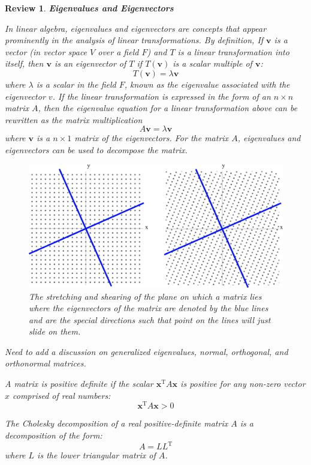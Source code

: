 \documentclass[12pt,letter]{article}
\numberwithin{ex}{section} %
\newtheorem{re}{Review}
\numberwithin{re}{section} %
\newenvironment{review}{\begin{mdframed}[middlelinewidth=2mm,roundcorner=20pt]\begin{re}\normalfont}{\end{re}\end{mdframed}}
\newcommand{\rd}[1]{\textcolor[rgb]{0.75,0.00,0.00}{#1}}
\begin{document}
\begin{review}

	\textbf{Eigenvalues and Eigenvectors}

	In linear algebra, eigenvalues and eigenvectors are concepts that appear prominently in the analysis of linear transformations. By definition, If  $\textbf{v}$ is a vector (in vector space $V$ over a field $F$) and $T$ is a linear transformation into itself, then $\textbf{v}$ is an eigenvector of $T$ if $T(\textbf{v})$ is a scalar multiple of $\textbf{v}$:
	\begin{equation}
	T(\textbf{v}) = \lambda\textbf{v}
	\end{equation}
	where $\lambda$ is a scalar in the field $F$, known as the eigenvalue associated with the eigenvector $v$. If the linear transformation is expressed in the form of an $n \times n$ matrix $A$, then the eigenvalue equation for a linear transformation above can be rewritten as the matrix multiplication
	\begin{equation}
	A\textbf{v} = \lambda\textbf{v}
	\end{equation}
	where $\textbf{v}$ is a $n \times 1$ matrix of the eigenvectors. For the matrix $A$, eigenvalues and eigenvectors can be used to decompose the matrix.

	\begin{figure}[H]
		\centering
		\includegraphics[]{../Figures/eigenvalues.png}
		\caption{The stretching and shearing of the plane on which a matrix lies where the eigenvectors of the matrix are denoted by the blue lines and are the special directions such that point on the lines will just slide on them.}
		\label{fig:eigenvalues}
	\end{figure}


	\rd{Need to add a discussion on generalized eigenvalues, normal, orthogonal, and orthonormal matrices.}	


	A matrix is positive definite if the scalar $\textbf{x}^{\text{T}}A\textbf{x}$ is positive for any non-zero vector $x$ comprised of real numbers:
	\begin{equation}
	\textbf{x}^{\text{T}}A\textbf{x} > 0
	\end{equation}
	
	The Cholesky decomposition of a real positive-definite matrix $A$ is a decomposition of the form:
	\begin{equation}
	A=LL^{\text{T}}
	\end{equation}
	where $L$ is the lower triangular matrix of $A$.

\end{review}
\end{document}
